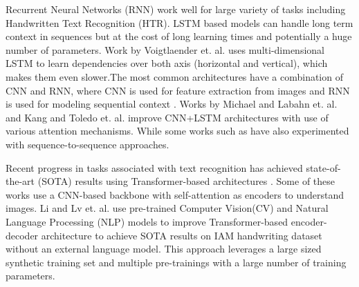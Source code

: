 \documentclass{article}
\begin{document}
Recurrent Neural Networks (RNN) work well for large variety of tasks including Handwritten Text Recognition (HTR). LSTM based models can handle long term context in sequences but at the cost of long learning times and potentially a huge number of parameters. Work by Voigtlaender et. al. \cite{voigtlaender2016handwriting} uses multi-dimensional LSTM to learn dependencies over both axis (horizontal and vertical), which makes them even slower.The most common architectures have a combination of CNN and RNN, where CNN is used for feature extraction from images and RNN is used for modeling sequential context \cite{wigington2017data,bluche2017gated}. Works by Michael and Labahn et. al. \cite{michael2019evaluating} and Kang and Toledo et. al.\cite{kang2018convolve} improve CNN+LSTM architectures with use of various attention mechanisms. While some works such as \cite{michael2019evaluating,bluche2016joint,chowdhury2018efficient,sueiras2018offline} have also experimented with sequence-to-sequence approaches. 

Recent progress in tasks associated with text recognition has achieved state-of-the-art (SOTA) results using Transformer-based architectures \cite{diaz2021rethinking,li2021trocr,kang2020pay}. Some of these works use a CNN-based backbone with self-attention as encoders to understand images\cite{li2021trocr}. Li and Lv et. al.\cite{li2021trocr} use pre-trained Computer Vision(CV) and Natural Language Processing (NLP) models to improve Transformer-based encoder-decoder architecture to achieve SOTA results on IAM handwriting dataset without an external language model. This approach leverages a large sized synthetic training set and multiple pre-trainings with a large number of training parameters.
\end{document}

